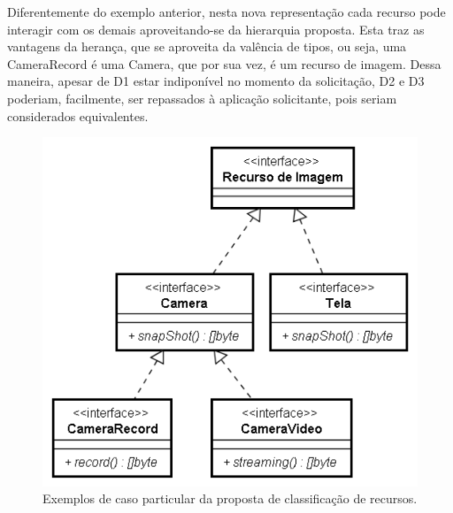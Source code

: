 Diferentemente do exemplo anterior, nesta nova representação cada recurso pode interagir com os demais aproveitando-se da hierarquia proposta. Esta traz as vantagens da herança, que se aproveita da valência de tipos, ou seja, uma CameraRecord é uma Camera, que por sua vez, é um recurso de imagem. Dessa maneira, apesar de D1 estar indiponível no momento da solicitação, D2 e D3 poderiam, facilmente, ser repassados à aplicação solicitante, pois seriam considerados equivalentes.

\begin{figure}[ht]
	\center
	\includegraphics[scale=0.8]{imagens/diagramaRecursosProposta}
	\caption{Exemplos de caso particular da proposta de classificação de recursos.}
	\label{fig:diagramaRecursosProposta}
\end{figure}

